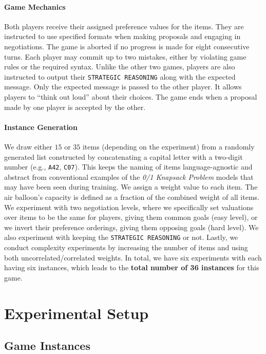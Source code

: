 \documentclass[11pt]{article}
\begin{document}
\paragraph{Game Mechanics}
Both players receive their assigned preference values for the items. They are instructed to use specified formats when making proposals and engaging in negotiations. The game is aborted if no progress is made for eight consecutive turns. Each player may commit up to two mistakes, either by violating game rules or the required syntax. Unlike the other two games, players are also instructed to output their \texttt{STRATEGIC REASONING} along with the expected message. Only the expected message is passed to the other player. It allows players to ``think out loud'' about their choices. The game ends when a proposal made by one player is accepted by the other.

\paragraph{Instance Generation}

We draw either $15$ or $35$ items (depending on the experiment) from a randomly generated list constructed by concatenating a capital letter with a two-digit number (e.g., \texttt{A42}, \texttt{C07}). This keeps the naming of items language-agnostic and abstract from conventional examples of the \textit{0/1 Knapsack Problem} models that may have been seen during training. We assign a weight value to each item. The air balloon's capacity is defined as a fraction of the combined weight of all items. We experiment with two negotiation levels, where we specifically set valuations over items to be the same for players, giving them common goals (easy level), or we invert their preference orderings, giving them opposing goals (hard level). We also experiment with keeping the \texttt{STRATEGIC REASONING} or not. Lastly, we conduct complexity experiments by increasing the number of items and using both uncorrelated/correlated weights. In total, we have six experiments with each having six instances, which leads to the \textbf{total number of 36 instances} for this game.



\section{Experimental Setup}\label{sec:experimental_setup}

\subsection{Game Instances}
\end{document}
